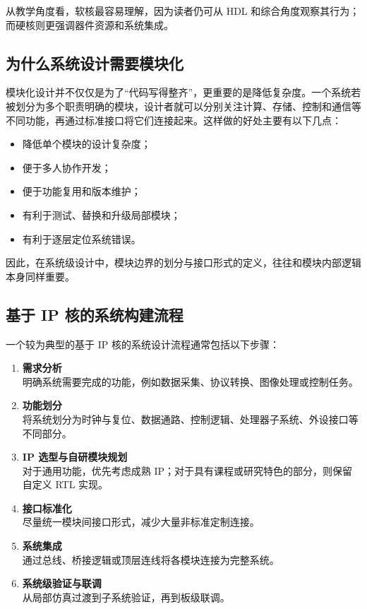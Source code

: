 从教学角度看，软核最容易理解，因为读者仍可从 HDL
和综合角度观察其行为；而硬核则更强调器件资源和系统集成。

\subsection{为什么系统设计需要模块化}\label{ux4e3aux4ec0ux4e48ux7cfbux7edfux8bbeux8ba1ux9700ux8981ux6a21ux5757ux5316}

模块化设计并不仅仅是为了``代码写得整齐''，更重要的是降低复杂度。一个系统若被划分为多个职责明确的模块，设计者就可以分别关注计算、存储、控制和通信等不同功能，再通过标准接口将它们连接起来。这样做的好处主要有以下几点：

\begin{itemize}
\tightlist
\item
  降低单个模块的设计复杂度；
\item
  便于多人协作开发；
\item
  便于功能复用和版本维护；
\item
  有利于测试、替换和升级局部模块；
\item
  有利于逐层定位系统错误。
\end{itemize}

因此，在系统级设计中，模块边界的划分与接口形式的定义，往往和模块内部逻辑本身同样重要。

\subsection{基于 IP
核的系统构建流程}\label{ux57faux4e8e-ip-ux6838ux7684ux7cfbux7edfux6784ux5efaux6d41ux7a0b}

一个较为典型的基于 IP 核的系统设计流程通常包括以下步骤：

\begin{enumerate}
\def\labelenumi{\arabic{enumi}.}
\item
  \textbf{需求分析}\\
  明确系统需要完成的功能，例如数据采集、协议转换、图像处理或控制任务。
\item
  \textbf{功能划分}\\
  将系统划分为时钟与复位、数据通路、控制逻辑、处理器子系统、外设接口等不同部分。
\item
  \textbf{IP 选型与自研模块规划}\\
  对于通用功能，优先考虑成熟
  IP；对于具有课程或研究特色的部分，则保留自定义 RTL 实现。
\item
  \textbf{接口标准化}\\
  尽量统一模块间接口形式，减少大量非标准定制连接。
\item
  \textbf{系统集成}\\
  通过总线、桥接逻辑或顶层连线将各模块连接为完整系统。
\item
  \textbf{系统级验证与联调}\\
  从局部仿真过渡到子系统验证，再到板级联调。
\end{enumerate}

